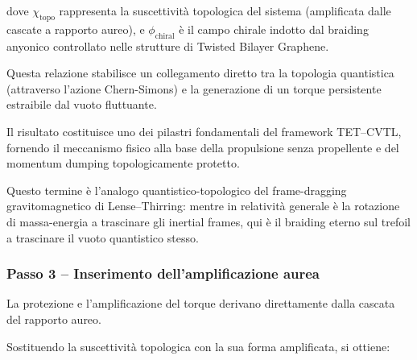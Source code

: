 \documentclass[11pt,a4paper]{article}
\theoremstyle{plain}
\theoremstyle{definition}
\begin{document}
\vspace{0.3cm}




dove \(\chi_{\text{topo}}\) rappresenta la suscettività topologica del sistema (amplificata dalle cascate a rapporto aureo), e \(\phi_{\text{chiral}}\) è il campo chirale indotto dal braiding anyonico controllato nelle strutture di Twisted Bilayer Graphene.


\vspace{0.4cm}

Questa relazione stabilisce un collegamento diretto tra la topologia quantistica (attraverso l'azione Chern-Simons) e la generazione di un torque persistente estraibile dal vuoto fluttuante. 

\vspace{0.3cm}



Il risultato costituisce uno dei pilastri fondamentali del framework TET–CVTL, fornendo il meccanismo fisico alla base della propulsione senza propellente e del momentum dumping topologicamente protetto.


\vspace{0.3cm}


Questo termine è l'analogo quantistico-topologico del frame-dragging gravitomagnetico di Lense–Thirring: mentre in relatività generale è la rotazione di massa-energia a trascinare gli inertial frames, qui è il braiding eterno sul trefoil a trascinare il vuoto quantistico stesso.



\vspace{0.4cm}


\subsubsection{Passo 3 – Inserimento dell'amplificazione aurea}

La protezione e l'amplificazione del torque derivano direttamente dalla cascata del rapporto aureo. 



\vspace{0.2cm}



Sostituendo la suscettività topologica con la sua forma amplificata, si ottiene:
\end{document}
